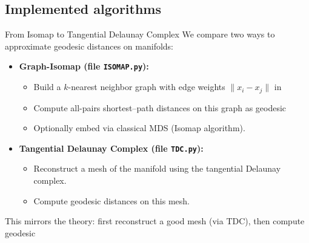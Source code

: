 \documentclass[9pt]{beamer}
\begin{document}
\subsection{Implemented algorithms}
%
\begin{frame}{From Isomap to Tangential Delaunay Complex}
%
We compare two ways to approximate geodesic distances on manifolds:
%
\begin{itemize}
 \item \textbf{Graph-Isomap (file \texttt{ISOMAP.py}):}
 \begin{itemize}
    \item Build a $k$-nearest neighbor graph with edge weights $\|x_i - x_j\|$ in %
    \item Compute all-pairs shortest--path distances on this graph as geodesic %
    \item Optionally embed via classical MDS (Isomap algorithm).
 \end{itemize}
%
 \item \textbf{Tangential Delaunay Complex (file \texttt{TDC.py}):}
\begin{itemize}
 \item Reconstruct a mesh of the manifold using the tangential Delaunay complex.
 \item Compute geodesic distances on this mesh.
\end{itemize}
%
\end{itemize}
%
\medskip
%
This mirrors the theory: first reconstruct a good mesh (via TDC), then compute geodesic %
%
\end{frame}



\end{document}
